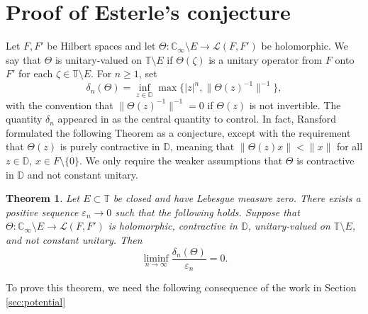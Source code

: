 \documentclass[11pt]{amsart}
\numberwithin{equation}{section}
\newtheorem{theorem}{Theorem}[section]
\newtheorem{lemma}[theorem]{Lemma}
\theoremstyle{definition}
\newcommand{\D}{\mathbb D}
\newcommand{\T}{\mathbb T}
\newcommand{\C}{\mathbb C}
\newcommand{\eps}{\varepsilon}
\newcommand{\calL}{\mathcal L}
\begin{document}
\section{Proof of Esterle's conjecture}

Let $F,F'$ be Hilbert spaces and let
$\Theta:\C_\infty\setminus E\to\calL(F,F')$ be holomorphic.  We say that
$\Theta$ is unitary-valued on $\T\setminus E$ if $\Theta(\zeta)$ is a
unitary operator from $F$ onto $F'$ for each $\zeta\in\T\setminus E$.
For $n\ge1$, set
$$
        \delta_n(\Theta)=
        \inf_{z\in\D}
        \max\bigl\{|z|^n,\|\Theta(z)^{-1}\|^{-1}\bigr\},
$$
with the convention that $\|\Theta(z)^{-1}\|^{-1}=0$ if $\Theta(z)$ is not
invertible. The quantity $\delta_n$ appeared in \cite{Ransford} as the central quantity to control. In fact, Ransford formulated the following Theorem as a conjecture, except with the requirement that  $\Theta(z)$ is purely contractive in $\D$, meaning that $\|\Theta(z) x\|<\|x\|$ for all $z\in\D$, $x\in  F \setminus\{0\}$.
We only require the weaker assumptions that $\Theta$ is contractive in $\D$ and not constant unitary.



\begin{theorem}\label{thm:operator-uniformity}
Let $E\subset\T$ be closed and have Lebesgue measure zero.  There exists a positive sequence
$\eps_n\to 0$ such that the following holds. Suppose that
$\Theta:\C_\infty\setminus E\to\calL(F,F')$ is holomorphic, contractive in
$\D$, unitary-valued on $\T\setminus E$, and not constant unitary.  Then
$$
        \liminf_{n\to\infty}\frac{\delta_n(\Theta)}{\eps_n}=0.
$$
\end{theorem}

To prove this theorem, we need the following consequence of the work in Section \ref{sec:potential}

\end{document}
